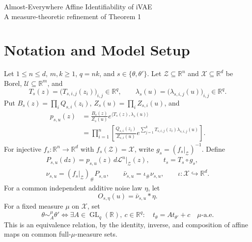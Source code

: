 \documentclass[11pt,a4paper]{article}
\newcommand{\R}{\mathbb R}
\newcommand{\Zset}{\mathcal Z}
\newcommand{\Xset}{\mathcal X}
\newcommand{\Uset}{\mathcal U}
\newcommand{\aev}{\text{-a.e.}}
\newcommand{\push}{_{\#}}
\newcommand{\GL}{\operatorname{GL}}
\newcommand{\Leb}{\mathcal L}
\newcommand{\ip}[2]{\langle #1,#2\rangle}
\begin{document}
\begin{center}
{\Large Almost-Everywhere Affine Identifiability of iVAE}\\[5pt]
{\normalsize A measure-theoretic refinement of Theorem 1}
\end{center}

\section*{Notation and Model Setup}
Let $1\le n\le d$, $m,k\ge1$, $q=nk$, and $s\in\{\theta,\theta'\}$.
Let $\Zset\subseteq\R^n$ and $\Xset\subseteq\R^d$ be Borel,
$\Uset\subseteq\R^m$, and
\[
 T_s(z)=\bigl(T_{s,i,j}(z_i)\bigr)_{i,j}\in\R^q,\qquad
 \lambda_s(u)=\bigl(\lambda_{s,i,j}(u)\bigr)_{i,j}\in\R^q.
\]
Put $B_s(z)=\prod_iQ_{s,i}(z_i)$, $Z_s(u)=\prod_iZ_{s,i}(u)$, and
\begin{align}
 p_{s,u}(z)
 &=\frac{B_s(z)}{Z_s(u)}e^{\ip{T_s(z)}{\lambda_s(u)}} \label{eq:prior}\\
 &=\prod_{i=1}^n
 \left[\frac{Q_{s,i}(z_i)}{Z_{s,i}(u)}
 e^{\sum_{j=1}^kT_{s,i,j}(z_i)\lambda_{s,i,j}(u)}\right].
 \nonumber
\end{align}
For injective $f_s:\R^n\to\R^d$ with $f_s(\Zset)=\Xset$, write
$g_s=(f_s|_{\Zset})^{-1}$. Define
\[
 \begin{gathered}
 P_{s,u}(dz)=p_{s,u}(z)\,d\Leb^n|_{\Zset}(z),\qquad t_s=T_s\circ g_s,\\
 \nu_{s,u}=(f_s|_{\Zset})\push P_{s,u},\qquad
 \bar\nu_{s,u}=\iota\push\nu_{s,u},\qquad
 \iota:\Xset\hookrightarrow\R^d.
 \end{gathered}
\]
For a common independent additive noise law $\eta$, let
\begin{equation}
 O_{s,\eta}(u)=\bar\nu_{s,u}*\eta. \label{eq:observed}
\end{equation}
For a fixed measure $\mu$ on $\Xset$, set
\[
 \theta\sim_A^\mu\theta'
 \iff \exists A\in\GL_q(\R),\ c\in\R^q:
 \quad t_\theta=A t_{\theta'}+c\quad\mu\aev
\]
This is an equivalence relation, by the identity, inverse, and composition
of affine maps on common full-$\mu$-measure sets.
\end{document}
